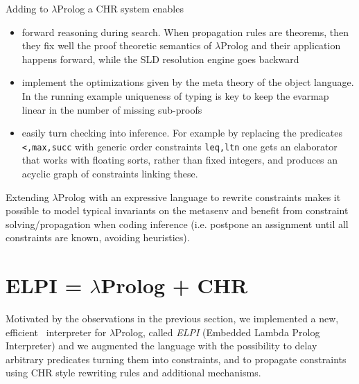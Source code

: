 \documentclass{easychair}
\begin{document}
Adding to $\lambda$Prolog a CHR system enables
\begin{itemize}
\item forward reasoning during search. When propagation rules are theorems,
	then they fix well the proof theoretic semantics of $\lambda$Prolog
	and their application happens forward, while the SLD resolution engine
	goes backward
\item implement the optimizations given by the meta theory of the object
	language.  In the running example uniqueness of typing is key to keep
	the evarmap linear in the number of missing sub-proofs
\item easily turn checking into inference.  For example by replacing the
	predicates \verb+<,max,succ+ with generic order constraints
	\verb+leq,ltn+ one gets an elaborator that works with floating sorts,
	rather than fixed integers, and produces an acyclic graph of
	constraints linking these.
\end{itemize}

Extending $\lambda$Prolog with an expressive language to rewrite 
constraints makes it possible to model typical invariants on
the metasenv and benefit from constraint solving/propagation when coding
inference (i.e. postpone an assignment until all constraints are known,
avoiding heuristics).

\section{ELPI = $\lambda$Prolog + CHR}\label{sec:elpi}

Motivated by the observations in the previous section, we implemented a new,
efficient~\cite{elpiLPAR} interpreter for $\lambda$Prolog, called \emph{ELPI}
(Embedded Lambda Prolog Interpreter) and we augmented the language with the
possibility to delay arbitrary predicates turning them into constraints, and to
propagate constraints using CHR style rewriting rules and additional
mechanisms.
\end{document}
